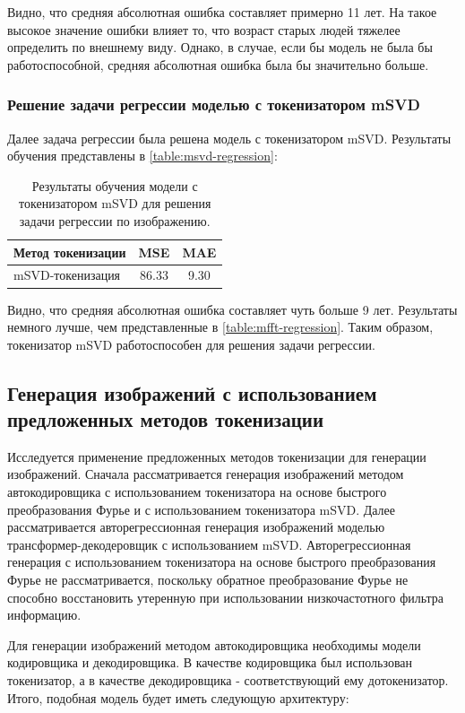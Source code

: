 Видно, что средняя абсолютная ошибка составляет примерно 11 лет. На такое высокое значение ошибки влияет то, что возраст старых людей тяжелее определить по внешнему виду. Однако, в случае, если бы модель не была бы работоспособной, средняя абсолютная ошибка была бы значительно больше.


\subsubsection{Решение задачи регрессии моделью с токенизатором mSVD}

Далее задача регрессии была решена модель с токенизатором mSVD. Результаты обучения представлены в \autoref{table:msvd-regression}:

\begin{table}[H]
  \centering
  \begin{tabular}{|l|c|c|}
    \hline
    Метод токенизации & MSE & MAE \\ \hline
    mSVD-токенизация & 86.33 & 9.30 \\
    \hline
  \end{tabular}
  \caption{Результаты обучения модели с токенизатором mSVD для решения задачи регрессии по изображению.}
  \label{table:msvd-regression}
\end{table}

Видно, что средняя абсолютная ошибка составляет чуть больше 9 лет. Результаты немного лучше, чем представленные в \autoref{table:mfft-regression}. Таким образом, токенизатор mSVD работоспособен для решения задачи регрессии.

\subsection{Генерация изображений с использованием предложенных методов токенизации}
Исследуется применение предложенных методов токенизации для генерации изображений. Сначала рассматривается генерация изображений методом автокодировщика с использованием токенизатора на основе быстрого преобразования Фурье и с использованием токенизатора mSVD. Далее рассматривается авторегрессионная генерация изображений моделью трансформер-декодеровщик с использованием mSVD. Авторегрессионная генерация с использованием токенизатора на основе быстрого преобразования Фурье не рассматривается, поскольку обратное преобразование Фурье не способно восстановить утеренную при использовании низкочастотного фильтра информацию.

Для генерации изображений методом автокодировщика необходимы модели кодировщика и декодировщика. В качестве кодировщика был использован токенизатор, а в качестве декодировщика - соответствующий ему дотокенизатор. Итого, подобная модель будет иметь следующую архитектуру:

